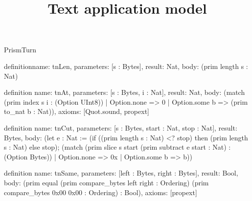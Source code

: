 \begin{lexlean}{PrismTurn}
\title{Text application model}
\begin{semanticmodule}
definition{name: tnLen, parameters: [s : Bytes], result: Nat, body: (prim length s : Nat)}

definition{
  name: tnAt,
  parameters: [s : Bytes, i : Nat],
  result: Nat,
  body: (match (prim index s i : (Option UInt8))
    | Option.none => 0
    | Option.some b => (prim to_nat b : Nat)),
  axioms: [Quot.sound, propext]
}

definition{
  name: tnCut,
  parameters: [s : Bytes, start : Nat, stop : Nat],
  result: Bytes,
  body: (let e : Nat := (if ((prim length s : Nat) <? stop) then (prim length s : Nat) else stop); (match (prim slice s start (prim subtract e start : Nat) : (Option Bytes))
    | Option.none => 0x
    | Option.some b => b))
}

definition{
  name: tnSame,
  parameters: [left : Bytes, right : Bytes],
  result: Bool,
  body: (prim equal (prim compare_bytes left right : Ordering) (prim compare_bytes 0x00 0x00 : Ordering) : Bool),
  axioms: [propext]
}


\end{semanticmodule}
\end{lexlean}
